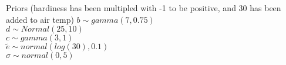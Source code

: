 \documentclass[11pt,letter]{article}
\begin{document}
Priors (hardiness has been multipled with -1 to be positive, and 30 has been added to air temp)
	$b \sim gamma(7,0.75)$\\
	$d \sim Normal(25, 10)$ \\
	$c \sim gamma(3,1)$\\
	$\tilde{e} \sim normal(log(30), 0.1)$ \\
	$\sigma \sim normal(0,5)$





\end{document}
